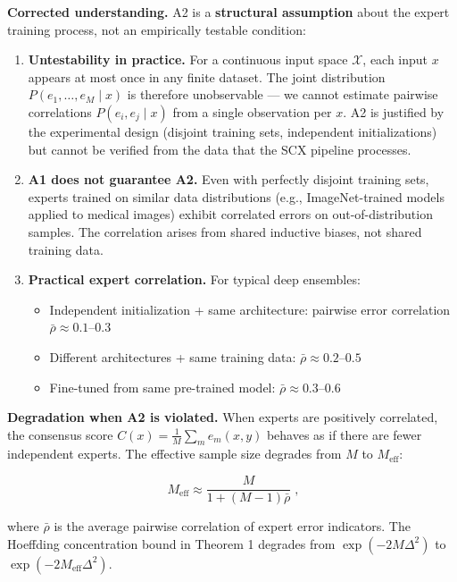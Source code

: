 \documentclass[
  12pt,
]{article}
\providecommand{\tightlist}{%
  \setlength{\itemsep}{0pt}\setlength{\parskip}{0pt}}
\begin{document}
\textbf{Corrected understanding.} A2 is a \textbf{structural assumption}
about the expert training process, not an empirically testable
condition:

\begin{enumerate}
\def\labelenumi{\arabic{enumi}.}
\item
  \textbf{Untestability in practice.} For a continuous input space
  \(\mathcal{X}\), each input \(x\) appears at most once in any finite
  dataset. The joint distribution \(P(e_1, \dots, e_M \mid x)\) is
  therefore unobservable --- we cannot estimate pairwise correlations
  \(P(e_i, e_j \mid x)\) from a single observation per \(x\). A2 is
  justified by the experimental design (disjoint training sets,
  independent initializations) but cannot be verified from the data that
  the SCX pipeline processes.
\item
  \textbf{A1 does not guarantee A2.} Even with perfectly disjoint
  training sets, experts trained on similar data distributions (e.g.,
  ImageNet-trained models applied to medical images) exhibit correlated
  errors on out-of-distribution samples. The correlation arises from
  shared inductive biases, not shared training data.
\item
  \textbf{Practical expert correlation.} For typical deep ensembles:

  \begin{itemize}
  \tightlist
  \item
    Independent initialization + same architecture: pairwise error
    correlation \(\bar{\rho} \approx 0.1\)--\(0.3\)
  \item
    Different architectures + same training data:
    \(\bar{\rho} \approx 0.2\)--\(0.5\)
  \item
    Fine-tuned from same pre-trained model:
    \(\bar{\rho} \approx 0.3\)--\(0.6\)
  \end{itemize}
\end{enumerate}

\textbf{Degradation when A2 is violated.} When experts are positively
correlated, the consensus score \(C(x) = \frac{1}{M}\sum_m e_m(x,y)\)
behaves as if there are fewer independent experts. The effective sample
size degrades from \(M\) to \(M_{\text{eff}}\):

\[\boxed{\;M_{\text{eff}} \approx \frac{M}{1 + (M-1)\bar{\rho}}\;},\]

where \(\bar{\rho}\) is the average pairwise correlation of expert error
indicators. The Hoeffding concentration bound in Theorem 1 degrades from
\(\exp(-2M\Delta^2)\) to \(\exp(-2M_{\text{eff}}\Delta^2)\).
\end{document}
